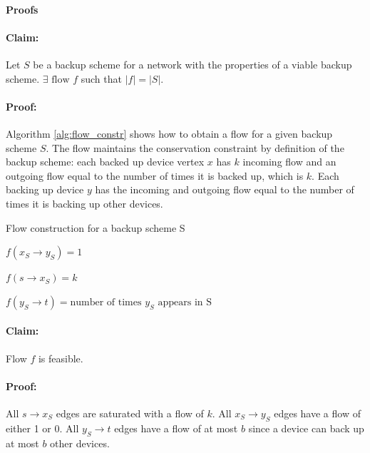 \paragraph{Proofs}

\paragraph{Claim:} Let $S$ be a backup scheme for a network with the properties of a viable backup scheme. $\exists{\text{ flow } f}$ such that $|f| = |S|$.

\paragraph{Proof:} Algorithm \ref{alg:flow_constr} shows how to obtain a flow for a given backup scheme $S$. The flow maintains the conservation constraint by definition of the backup scheme: each backed up device vertex $x$ has $k$ incoming flow and an outgoing flow equal to the number of times it is backed up, which is $k$. Each backing up device $y$ has the incoming and outgoing flow equal to the number of times it is backing up other devices.


\begin{algorithm}[H]
	\caption{Flow construction for a backup scheme S}
	\label{alg:flow_constr}
	\begin{algorithmic}
	  		\State $f(x_S \rightarrow y_S) = 1$
	  	\EndFor
	  	
	  		\State $f(s \rightarrow x_S) = k$
	  	\EndFor
	  	
	  		\State $f(y_S \rightarrow t) = \text{number of times $y_S$ appears in S}$
		\EndFor
	\end{algorithmic}
\end{algorithm}

\paragraph{Claim:} Flow $f$ is feasible.
\paragraph{Proof:} All $s \rightarrow x_S$ edges are saturated with a flow of $k$. All $x_S \rightarrow y_S$ edges have a flow of either 1 or 0. All $y_S \rightarrow t$ edges have a flow of at most $b$ since a device can back up at most $b$ other devices.

